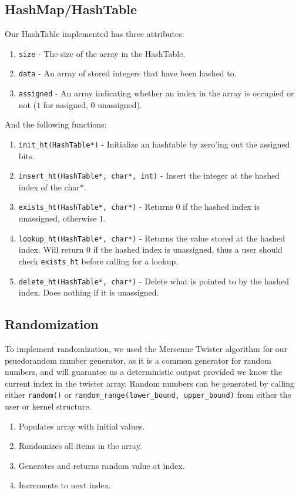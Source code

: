\documentclass[12pt]{article}
\begin{document}
\subsection{HashMap/HashTable}
Our HashTable implemented has three attributes:
\begin{enumerate}
  \item \texttt{size} - The size of the array in the HashTable.
  \item \texttt{data} - An array of stored integers that have been hashed to.
  \item \texttt{assigned} - An array indicating whether an index in the array is occupied or not ($1$ for assigned, $0$ unassigned).
\end{enumerate}
And the following functions:
\begin{enumerate}
  \item \texttt{init\_ht(HashTable*)} - Initialize an hashtable by zero'ing out the assigned bits.
  \item \texttt{insert\_ht(HashTable*, char*, int)} - Insert the integer at the hashed index of the char*.
  \item \texttt{exists\_ht(HashTable*, char*)} - Returns $0$ if the hashed index is unassigned, otherwise $1$.
  \item \texttt{lookup\_ht(HashTable*, char*)} - Returns the value stored at the hashed index.  Will return $0$ if the hashed index is unassigned, thus a user should check \texttt{exists\_ht} before calling for a lookup.
  \item \texttt{delete\_ht(HashTable*, char*)} - Delete what is pointed to by the hashed index.  Does nothing if it is unassigned.
    \\[1\baselineskip]
\end{enumerate}
\subsection{Randomization}
To implement randomization, we used the Mersenne Twister algorithm for our psuedorandom number generator, as it is a common generator for random numbers, and will guarantee us a deterministic output provided we know the current index in the twister array.  Random numbers can be generated by calling either \texttt{random()} or \texttt{random\_range(lower\_bound, upper\_bound)} from either the user or kernel structure.
\begin{enumerate}
  \item Populates array with initial values.
  \item Randomizes all items in the array.
  \item Generates and returns random value at index.
  \item Increments to next index.
    \\[1\baselineskip]
\end{enumerate}
\end{document}
